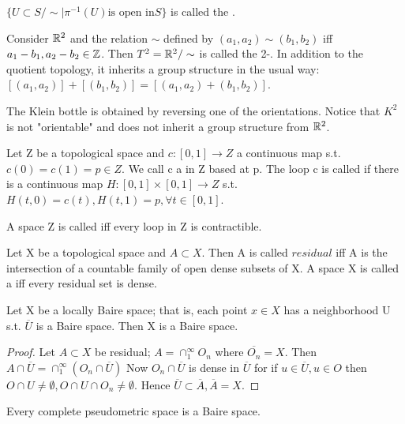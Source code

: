\begin{definition}
$\lbrace U\subset S/\sim\mid \pi^{-1}(U) \text{is open in} S\rbrace$ is called the .
\end{definition}
\begin{example}
Consider $\mathbb{R}^{2}$ and the relation $\sim$ defined by $(a_1,a_2)\sim (b_1,b_2)$ iff $a_1-b_1,a_2-b_2\in \mathbb{Z}$. Then $T^2=\mathbb{R}^{2}/\sim$
is called the 2-. In addition to the quotient topology, it inherits a group structure in the usual way: $[(a_1,a_2)]+
[(b_1,b_2)]=[(a_1,a_2)+(b_1,b_2)]$.
\end{example}
\begin{example}
The Klein bottle is obtained by reversing one of the orientations. Notice that $K^2$ is not "orientable" and does not inherit a 
group structure from $\mathbb{R}^{2}$.
\end{example}
\begin{definition}
Let Z be a topological space and $c:[0,1]\rightarrow Z$ a continuous map s.t. $c(0)=c(1)=p\in Z$. We call c a  in Z
based at p. The loop c is called  if there is a continuous map $H:[0,1]\times [0,1]\rightarrow Z$ s.t. $H(t,0)=
c(t),H(t,1)=p, \forall t\in [0,1]$.
\end{definition}
\begin{definition}
A space Z is called  iff every loop in Z is contractible.
\end{definition}
\begin{definition}
Let X be a topological space and $A\subset X$. Then A is called $residual$ iff A is the intersection of a countable family of
open dense subsets of X. A space X is called a  iff every residual set is dense.
\end{definition}
\begin{lem}
Let X be a locally Baire space; that is, each point $x\in X$ has a neighborhood U s.t. $\overline{U}$ is a Baire space. Then X 
is a Baire space.
\end{lem}
\begin{proof}
Let $A\subset X$ be residual; $A=\cap_1^\infty O_n$ where $\overline{O_n}=X$. Then $A\cap \overline{U}=\cap_1^\infty (O_n\cap
\overline{U})$ Now $O_n\cap \overline{U}$ is dense in $\overline{U}$ for if $u\in \overline{U}, u\in O$ then $O\cap U\neq\emptyset,
O\cap U \cap O_n\neq\emptyset$. Hence $\overline{U}\subset \overline{A},  \overline{A}=X$.
\end{proof}
\begin{thm}
Every complete pseudometric space is a Baire space.
\end{thm}
